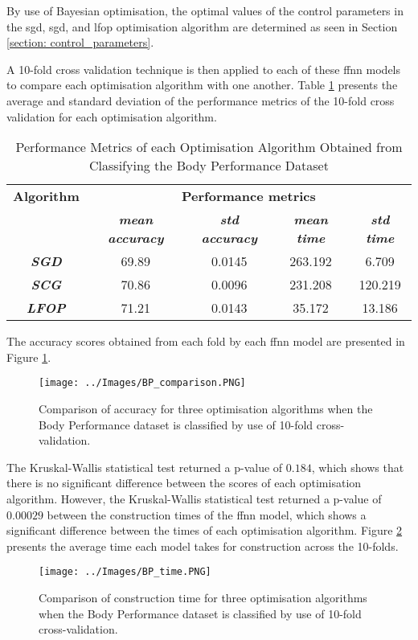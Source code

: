\documentclass[10pt, conference]{IEEEtran}
\begin{document}
By use of Bayesian optimisation, the optimal values of the control parameters in the
\acrshort{sgd}, \acrshort{sgd}, and \acrshort{lfop} optimisation algorithm are determined as seen in
Section \ref{section: control_parameters}.

A 10-fold cross validation technique is then applied to each of these \acrshort{ffnn} models to compare each
optimisation algorithm with one another. Table \ref{table: BP_performance_metrics} presents the average
and standard deviation of the performance metrics of the 10-fold cross validation for each optimisation algorithm.
\begin{table}[H]
    \caption{Performance Metrics of each Optimisation Algorithm Obtained from Classifying the Body Performance Dataset}
    \begin{center}
        \begin{tabular}{|c||c|c|c|c|}
            \hline
            \textbf{Algorithm}&\multicolumn{4}{|c|}{\textbf{Performance metrics}} \\
            \cline{2-5}
                        & \textbf{\textit{mean accuracy}} & \textbf{\textit{std accuracy}} & \textbf{\textit{mean time}} & \textbf{\textit{std time}}\\
            \hline
            \textbf{\textit{SGD}}  & 69.89 & 0.0145 & 263.192 & 6.709\\
            \textbf{\textit{SCG}}  & 70.86 & 0.0096 & 231.208 & 120.219\\
            \textbf{\textit{LFOP}} & 71.21 & 0.0143 & 35.172 & 13.186\\
            \hline
        \end{tabular}
    \end{center}
    \label{table: BP_performance_metrics}
\end{table}

The accuracy scores obtained from each fold by each \acrshort{ffnn}
model are presented in Figure \ref{fig:BP_comparison}.
\begin{figure}[H]
    \centerline{\texttt{[image: ../Images/BP\_comparison.PNG]}}
    \caption{Comparison of accuracy for three optimisation algorithms when the Body Performance dataset is classified by use of 10-fold cross-validation.}
    \label{fig:BP_comparison}
\end{figure}
The Kruskal-Wallis statistical test returned a p-value of $0.184$, which shows that
there is no significant difference between the scores of each optimisation algorithm.
However, the Kruskal-Wallis statistical test returned a p-value of $0.00029$
between the construction times of the \acrshort{ffnn} model, which shows a significant
difference between the times of each optimisation algorithm. Figure \ref{fig:BP_time}
presents the average time each model takes for construction across the 10-folds.
\begin{figure}[H]
    \centerline{\texttt{[image: ../Images/BP\_time.PNG]}}
    \caption{Comparison of construction time for three optimisation algorithms when the Body Performance dataset is classified by use of 10-fold cross-validation.}
    \label{fig:BP_time}
\end{figure}
\end{document}
